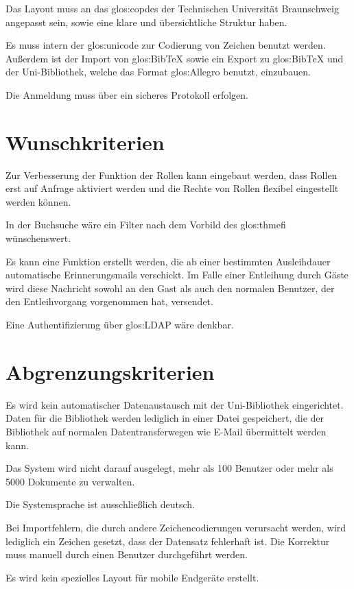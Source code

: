 Das Layout muss an das \gls{glos:copdes} der Technischen Universität Braunschweig angepasst sein, sowie eine klare und übersichtliche Struktur haben. 

Es muss intern der \gls{glos:unicode} zur Codierung von Zeichen benutzt werden. Außerdem ist der Import von \gls{glos:BibTeX} sowie ein Export zu \gls{glos:BibTeX} und der Uni-Bibliothek, welche das Format \gls{glos:Allegro} benutzt, einzubauen. 

Die Anmeldung muss über ein sicheres Protokoll erfolgen.

\section{Wunschkriterien}
Zur Verbesserung der Funktion der Rollen kann eingebaut werden, dass Rollen erst auf Anfrage aktiviert werden und die Rechte von Rollen flexibel eingestellt werden können. 

In der Buchsuche wäre ein Filter nach dem Vorbild des \gls{glos:thmefi} wünschenswert. 

Es kann eine Funktion erstellt werden, die ab einer bestimmten Ausleihdauer automatische Erinnerungsmails verschickt. Im Falle einer Entleihung durch Gäste wird diese Nachricht sowohl an den Gast als auch den normalen Benutzer, der den Entleihvorgang vorgenommen hat, versendet. 

Eine Authentifizierung über \gls{glos:LDAP} wäre denkbar.

\section{Abgrenzungskriterien}
Es wird kein automatischer Datenaustausch mit der Uni-Bibliothek eingerichtet. Daten für die Bibliothek werden lediglich in einer Datei gespeichert, die der Bibliothek auf normalen Datentransferwegen wie E-Mail übermittelt werden kann. 

Das System wird nicht darauf ausgelegt, mehr als 100 Benutzer oder mehr als 5000 Dokumente zu verwalten.

Die Systemsprache ist ausschließlich deutsch.

Bei Importfehlern, die durch andere Zeichencodierungen verursacht werden, wird lediglich ein Zeichen gesetzt, dass der Datensatz fehlerhaft ist. Die Korrektur muss manuell durch einen Benutzer durchgeführt werden.

Es wird kein spezielles Layout für mobile Endgeräte erstellt.
